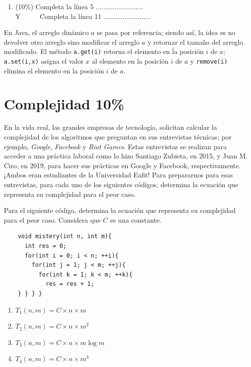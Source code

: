 \documentclass[10 pt]{article}
\begin{document}
\begin{multicols}{2}
		\begin{enumerate}[label=\Alph*]
			\item (10\%) Completa la línea 5 .........................\\
			Y \ \ \ \ \ Completa la línea 11
			.........................
		\end{enumerate}

		En Java, el arreglo dinámico $a$ se pasa por referencia; siendo así, la idea es no devolver otro arreglo sino modificar el arreglo $a$ y retornar el tamaño del arreglo modificado. El método \texttt{a.get(i)} retorna el elemento en ĺa posición $i$ de $a$; \texttt{a.set(i,x)} asigna el valor $x$ al elemento en la posición $i$ de $a$ y \texttt{remove(i)} elimina el elemento en la posición $i$ de $a$.

		\section{Complejidad 10\%}
En la vida real, las grandes empresas de tecnología, solicitan calcular la complejidad de los algoritmos que preguntan en sus entrevistas técnicas; por ejemplo, \textit{Google}, \textit{Facebook} y \textit{Riot Games}. Estas entrevistas se realizan para acceder a una práctica laboral como lo hizo Santiago Zubieta, en 2015, y Juan M. Ciro, en 2019, para hacer sus prácticas en Google y Facebook, respectivamente. ¡Ambos eran estudiantes de la Universidad Eafit! Para prepararnos para esas entrevistas, para cada uno de los siguientes códigos, determina la ecuación que representa su complejidad para el peor caso.

		 Para el siguiente código, determina la ecuación que representa su complejidad para el peor caso. Considera que $C$ es una constante.

		  {\small
		\begin{lstlisting}
	void mistery(int n, int m){
	  int res = 0;
	  for(int i = 0; i < n; ++i){
	    for(int j = 1; j < m; ++j){
	      for(int k = 1; k < m; ++k){
	        res = res + 1;
	} } } }
		\end{lstlisting}
}

		\begin{enumerate}[topsep=0pt,itemsep=-1ex,partopsep=1ex,parsep=1ex,label=\Alph*]
			\item $T_1(n, m) = C \times n \times m$
			\item $T_2(n, m) = C \times n \times m^2$
			\item $T_3(n, m) = C \times n \times m \log m$
			\item $T_4(n, m) = C \times n \times m^3$
		\end{enumerate}


\end{multicols}
\end{document}
